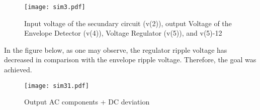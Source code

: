\begin{figure}[h] \centering
\texttt{[image: sim3.pdf]}
\caption{Input voltage of the secundary circuit (v(2)), output Voltage of the Envelope Detector (v(4)), Voltage Regulator (v(5)), and v(5)-12}
\label{fig:sim5}
\end{figure}

In the figure below, as one may observe, the regulator ripple voltage has decreased in comparison with the envelope ripple voltage. Therefore, the goal was achieved.


\begin{figure}[h] \centering
\texttt{[image: sim31.pdf]}
\caption{Output AC components + DC deviation}
\label{fig:sim5}
\end{figure}


